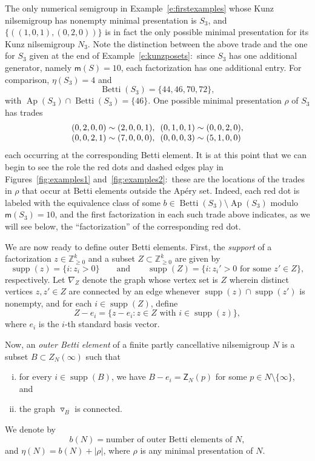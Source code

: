 \documentclass[ALCO]{cedram}
\newcommand\ZZ{\mathbb{Z}}
\DeclareMathOperator\Betti{Betti}
\DeclareMathOperator\Ap{Ap}
\DeclareMathOperator\supp{supp}
\begin{document}
\begin{exam}\label{e:nilsemigroupminpres}
The only numerical semigroup in Example~\ref{e:firstexamples} whose Kunz nilsemigroup has nonempty minimal presentation is $S_3$, and $\{((1,0,1), (0,2,0))\}$ is in fact the only possible minimal presentation for its Kunz nilsemigroup $N_3$.  
Note the distinction between the above trade and the one for $S_3$ given at the end of Example~\ref{e:kunzposets}:\ since $S_3$ has one additional generator, namely $\mathsf m(S) = 10$, each factorization has one additional entry.  
For comparison, $\eta(S_3) = 4$ and 
$$\Betti(S_3) = \{44, 46, 70, 72\},$$
with $\Ap(S_3) \cap \Betti(S_3) = \{46\}$.  
One possible minimal presentation $\rho$ of $S_3$ has trades
$$
\begin{array}{@{}l@{\,\,\,\,}l@{}}
(0,2,0,0) \sim (2,0,0,1), & (0,1,0,1) \sim (0,0,2,0), \\
(0,0,2,1) \sim (7,0,0,0), & (0,0,0,3) \sim (5,1,0,0)
\end{array}
$$
each occurring at the corresponding Betti element.  
It is at this point that we can begin to see the role the red dots and dashed edges play in Figures~\ref{fig:examples1} and~\ref{fig:examples2}:\ these are the locations of the trades in $\rho$ that occur at Betti elements outside the Ap\'ery set.  Indeed, each red dot is labeled with the equivalence class of some $b \in \Betti(S_3) \setminus \Ap(S_3)$ modulo $\mathsf m(S_3) = 10$, and the first factorization in each such trade above indicates, as we will see below, the ``factorization'' of the corresponding red dot.  
\end{exam}

We are now ready to define outer Betti elements.  First, the \emph{support} of a factorization $z \in \ZZ_{\ge 0}^k$ and a subset $Z \subset \ZZ_{\ge 0}^k$ are given by
$$
\supp(z) = \{i : z_i > 0\}
\qquad \text{and} \qquad
\supp(Z) = \{i : z_i' > 0 \text{ for some } z' \in Z\},
$$
respectively.  Let $\nabla_Z$ denote the graph whose vertex set is $Z$ wherein distinct vertices $z, z' \in Z$ are connected by an edge whenever $\supp(z) \cap \supp(z')$ is nonempty, and for each $i \in \supp(Z)$, define 
$$Z - e_i = \{ z - e_i :  z \in Z \text{ with } i \in \supp(z) \},$$
where $e_i$ is the $i$-th standard basis vector.  

Now, an \emph{outer Betti element} of a finite partly cancellative nilsemigroup $N$ is a subset $B \subset Z_N(\infty)$  such that
\begin{enumerate}[(i)]
\item 
for every $i \in \supp(B)$, we have $B - e_i = \mathsf Z_N(p)$ for some $p \in N \setminus \{\infty\}$, and

\item 
the graph $\triangledown_B$ is connected.
\end{enumerate}
We denote by 
$$b(N) = \text{number of outer Betti elements of } N,$$
and $\eta(N) = b(N) + |\rho|$, where $\rho$ is any minimal presentation of $N$.  
\end{document}
